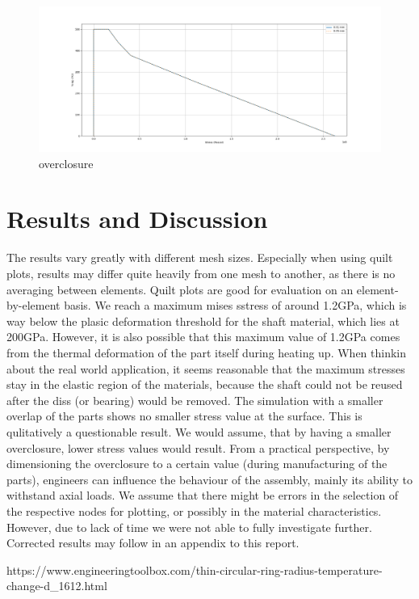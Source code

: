 \documentclass[12pt]{article}
\begin{document}
\begin{figure}[!htb]
  \centering
  \includegraphics[width=0.9\linewidth]{pics/result10and50}
 \caption{overclosure}
  \label{fig:1}
\end{figure}




\pagebreak
\section{Results and Discussion}

The results vary greatly with different mesh sizes. Especially when using quilt plots,
results may differ quite heavily from one mesh to another, as there is no averaging between elements.
Quilt plots are good for evaluation on an element-by-element basis.
We reach a maximum mises sstress of around 1.2GPa, which is way below the plasic deformation threshold
for the shaft material, which lies at 200GPa. 
However, it is also possible that this maximum value of 1.2GPa comes from the thermal 
deformation of the part itself during heating up.
When thinkin about the real world application, it seems
reasonable that the maximum stresses stay in the elastic
region of the materials, because the shaft could not be reused after the diss (or bearing) would be removed.
The simulation with a smaller overlap of the parts shows no smaller stress value at the surface.
This is qulitatively a questionable result. We would assume, that by having a smaller
overclosure, lower stress values would result.
From a practical perspective, by dimensioning the overclosure to a certain
value (during manufacturing of the parts), engineers can influence the behaviour of the 
assembly, mainly its ability to withstand axial loads. 
We assume that there might be errors in the selection of the respective nodes for plotting,
or possibly in the material characteristics. However, due to lack of time we were not able to 
fully investigate further. Corrected results may follow in an appendix to this report.

\pagebreak
\begin{thebibliography}{9}
  https://www.engineeringtoolbox.com/thin-circular-ring-radius-temperature-change-d\_1612.html
\end{thebibliography}
\end{document}
